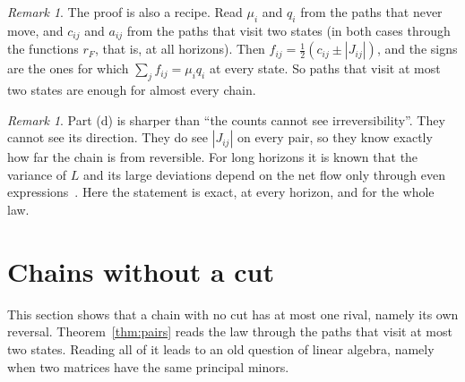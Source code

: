 \documentclass[11pt]{article}
\theoremstyle{definition}
\theoremstyle{remark}
\newtheorem{remark}[theorem]{Remark}
\begin{document}
\begin{remark}
The proof is also a recipe. Read $\mu_i$ and $q_i$ from the paths that never
move, and $c_{ij}$ and $a_{ij}$ from the paths that visit two states (in both
cases through the functions $r_F$, that is, at all horizons). Then
$f_{ij}=\frac12(c_{ij}\pm|J_{ij}|)$, and the signs are the ones for which
$\sum_jf_{ij}=\mu_iq_i$ at every state. So paths that visit at most two states
are enough for almost every chain.
\end{remark}

\begin{remark}
Part (d) is sharper than ``the counts cannot see irreversibility''. They cannot
see its direction. They do see $|J_{ij}|$ on every pair, so they know exactly
how far the chain is from reversible. For long horizons it is known that the
variance of $L$ and its large deviations depend on the net flow only through
even expressions~\cite{dlp2016,kjz2017}. Here the statement is exact, at every
horizon, and for the whole law.
\end{remark}

\section{Chains without a cut}\label{sec:rigid}

This section shows that a chain with no cut has at most one rival, namely its
own reversal. Theorem~\ref{thm:pairs} reads the law through the paths that visit at most two
states. Reading all of it leads to an old question of linear algebra, namely
when two matrices have the same principal minors.
\end{document}
